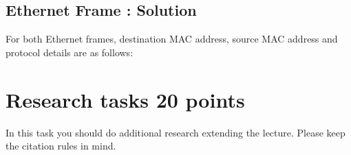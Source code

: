 \documentclass{resources/WeSTassignment}
\begin{document}
\subsection{Ethernet Frame : Solution}
For both Ethernet frames, destination MAC address, source MAC address and protocol details are as follows:
\begin{table}[h]
\centering
\caption{Destination MAC address, Source MAC address and Protocol}
\label{tab:Destination MAC address, Source MAC address and Protocol}
\end{table}
    
    

\section{Research tasks \hfill {20 points}}
In this task you should do additional research extending the lecture. Please keep the citation rules in mind.
\end{document}
